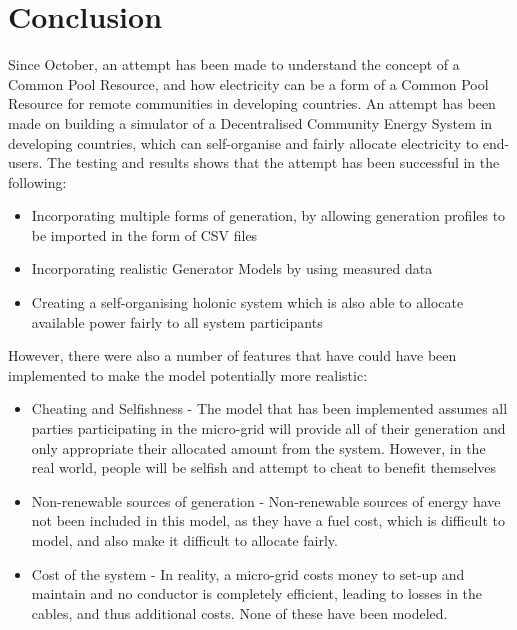 \chapter{Conclusion}
\label{Conclusions}

Since October, an attempt has been made to understand the concept of a Common Pool Resource, and how electricity can be a form of a Common Pool Resource for remote communities in developing countries. An attempt has been made on building a simulator of a Decentralised Community Energy System in developing countries, which can self-organise and fairly allocate electricity to end-users. The testing and results shows that the attempt has been successful in the following:
\begin{itemize}
	\item Incorporating multiple forms of generation, by allowing generation profiles to be imported in the form of CSV files
	\item Incorporating realistic Generator Models by using measured data
	\item Creating a self-organising holonic system which is also able to allocate available power fairly to all system participants
\end{itemize}

However, there were also a number of features that have could have been implemented to make the model potentially more realistic:
\begin{itemize}
	\item Cheating and Selfishness - The model that has been implemented assumes all parties participating in the micro-grid will provide all of their generation and only appropriate their allocated amount from the system. However, in the real world, people will be selfish and attempt to cheat to benefit themselves  
	\item Non-renewable sources of generation - Non-renewable sources of energy have not been included in this model, as they have a fuel cost, which is difficult to model, and also make it difficult to allocate fairly. 
	\item Cost of the system - In reality, a micro-grid costs money to set-up and maintain and no conductor is completely efficient, leading to losses in the cables, and thus additional costs. None of these have been modeled.
\end{itemize}



